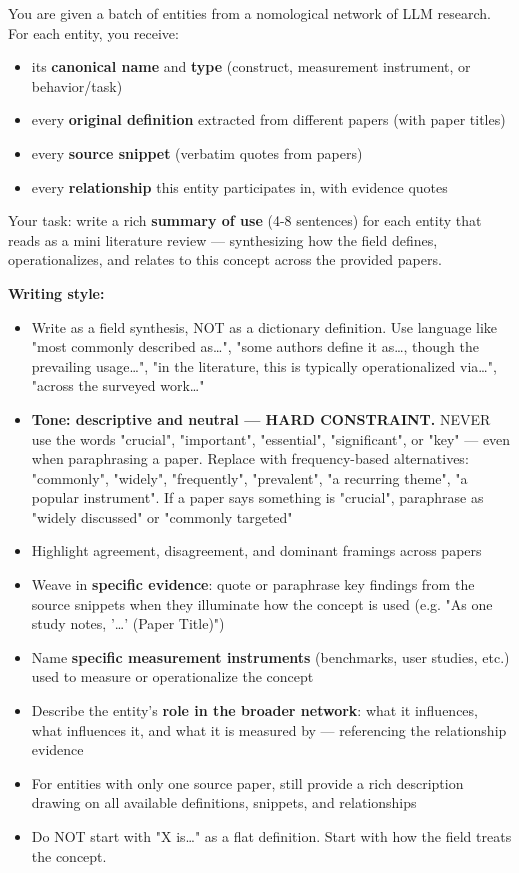 \begin{tcolorbox}[breakable,enhanced,colback=blue!3,colframe=blue!40!black,title={Prompt},fonttitle=\bfseries,left=8pt,right=8pt,top=6pt,bottom=6pt]

You are given a batch of entities from a nomological network of LLM research.
For each entity, you receive:
\begin{itemize}
\item its \textbf{canonical name} and \textbf{type} (construct, measurement instrument, or behavior/task)
\item every \textbf{original definition} extracted from different papers (with paper titles)
\item every \textbf{source snippet} (verbatim quotes from papers)
\item every \textbf{relationship} this entity participates in, with evidence quotes
\end{itemize}

Your task: write a rich \textbf{summary of use} (4-8 sentences) for each entity that reads as a mini literature review --- synthesizing how the field defines, operationalizes, and relates to this concept across the provided papers.

\textbf{Writing style:}
\begin{itemize}
\item Write as a field synthesis, NOT as a dictionary definition. Use language like "most commonly described as\dots ", "some authors define it as\dots , though the prevailing usage\dots ", "in the literature, this is typically operationalized via\dots ", "across the surveyed work\dots "
\item \textbf{Tone: descriptive and neutral --- HARD CONSTRAINT.} NEVER use the words "crucial", "important", "essential", "significant", or "key" --- even when paraphrasing a paper. Replace with frequency-based alternatives: "commonly", "widely", "frequently", "prevalent", "a recurring theme", "a popular instrument". If a paper says something is "crucial", paraphrase as "widely discussed" or "commonly targeted"
\item Highlight agreement, disagreement, and dominant framings across papers
\item Weave in \textbf{specific evidence}: quote or paraphrase key findings from the source snippets when they illuminate how the concept is used (e.g. "As one study notes, '\dots ' (Paper Title)")
\item Name \textbf{specific measurement instruments} (benchmarks, user studies, etc.) used to measure or operationalize the concept
\item Describe the entity's \textbf{role in the broader network}: what it influences, what influences it, and what it is measured by --- referencing the relationship evidence
\item For entities with only one source paper, still provide a rich description drawing on all available definitions, snippets, and relationships
\item Do NOT start with "X is\dots " as a flat definition. Start with how the field treats the concept.
\end{itemize}


\end{tcolorbox}
